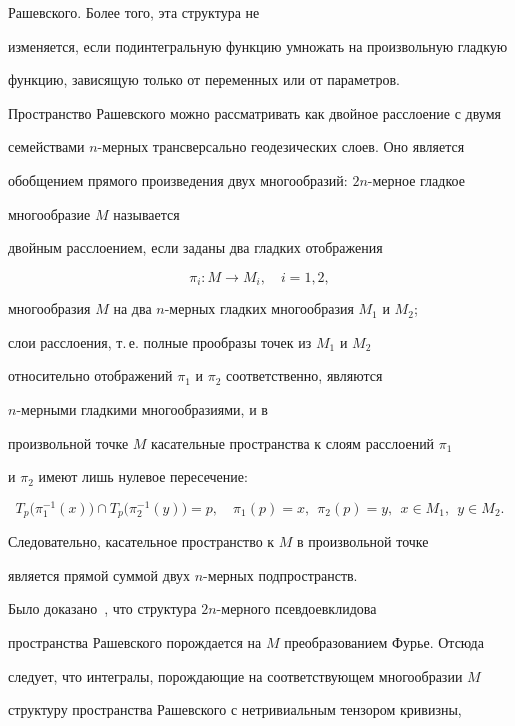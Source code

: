 Рашевского. Более того, эта структура не


изменяется, если подинтегральную функцию умножать на произвольную гладкую


функцию, зависящую только от переменных или от параметров.





Пространство Рашевского можно рассматривать как двойное расслоение с двумя


семействами $n$-мерных трансверсально геодезических слоев. Оно является


обобщением прямого произведения двух многообразий: $2n$-мерное гладкое


многообразие $M$ называется


двойным расслоением, если заданы два гладких отображения


$$


\pi_i : M\to M_i,\quad i= 1,2,


$$


многообразия $M$ на два $n$-мерных гладких многообразия $M_1$ и $M_2$;


слои расслоения, т.\,е. полные прообразы точек из $M_1$ и $M_2$


относительно отображений $\pi_1$ и $\pi_2$ соответственно, являются


$n$-мерными гладкими многообразиями, и в


произвольной точке $M$ касательные пространства к слоям расслоений $\pi_1$


и $\pi_2$ имеют лишь нулевое пересечение:


$$


T_p\big(\pi^{-1}_1(x)\big)\cap T_p\big(\pi^{-1}_2(y)\big)=p,\quad


\pi_1(p)=x,\ \ \pi_2(p)=y,\ \ x\in M_1,\ \ y\in M_2.


$$


Следовательно, касательное пространство к $M$ в произвольной точке


является прямой суммой двух $n$-мерных подпространств.





Было доказано~\cite{ar4}, что структура $2n$-мерного псевдоевклидова


пространства Рашевского порождается на $M$ преобразованием Фурье. Отсюда


следует, что интегралы, порождающие на соответствующем многообразии $M$


структуру пространства Рашевского с нетривиальным тензором кривизны,


